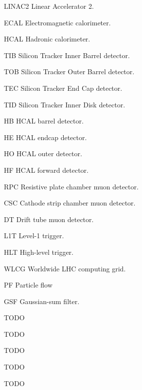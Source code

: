\begin{abbreviations}
\item[LINAC2] Linear Accelerator 2.
\item[ECAL] Electromagnetic calorimeter.
\item[HCAL] Hadronic calorimeter.
\item[TIB] Silicon Tracker Inner Barrel detector. 
\item[TOB] Silicon Tracker Outer Barrel detector. 
\item[TEC] Silicon Tracker End Cap detector. 
\item[TID] Silicon Tracker Inner Disk detector. 
\item[HB] HCAL barrel detector.
\item[HE] HCAL endcap detector.
\item[HO] HCAL outer detector.
\item[HF] HCAL forward detector.
\item[RPC] Resistive plate chamber muon detector.
\item[CSC] Cathode strip chamber muon detector.
\item[DT] Drift tube muon detector.
\item[L1T] Level-1 trigger.
\item[HLT] High-level trigger.
\item[WLCG] Worldwide LHC computing grid.
\item[PF] Particle flow
\item[GSF] Gaussian-sum filter.
\item[] TODO
\item[] TODO
\item[] TODO
\item[] TODO
\item[] TODO
\end{abbreviations}
\clearpage